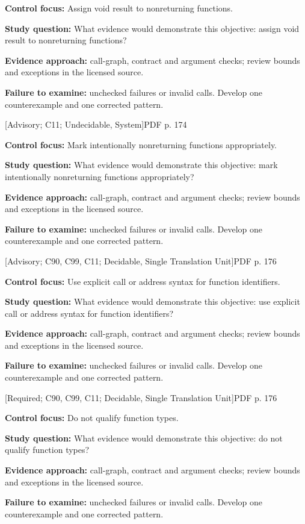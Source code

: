 \documentclass[10pt,letterpaper]{article}
\begin{document}
\textbf{Control focus:} Assign void result to nonreturning functions.\par
\textbf{Study question:} What evidence would demonstrate this objective: assign void result to nonreturning functions?\par
\textbf{Evidence approach:} call-graph, contract and argument checks; review bounds and exceptions in the licensed source.\par
\textbf{Failure to examine:} unchecked failures or invalid calls. Develop one counterexample and one corrected pattern.\par
\smallskip
{}
 \textsf{\footnotesize [Advisory; C11; Undecidable, System]}\hfill{\footnotesize PDF p. 174}\par
\textbf{Control focus:} Mark intentionally nonreturning functions appropriately.\par
\textbf{Study question:} What evidence would demonstrate this objective: mark intentionally nonreturning functions appropriately?\par
\textbf{Evidence approach:} call-graph, contract and argument checks; review bounds and exceptions in the licensed source.\par
\textbf{Failure to examine:} unchecked failures or invalid calls. Develop one counterexample and one corrected pattern.\par
\smallskip
{}
 \textsf{\footnotesize [Advisory; C90, C99, C11; Decidable, Single Translation Unit]}\hfill{\footnotesize PDF p. 176}\par
\textbf{Control focus:} Use explicit call or address syntax for function identifiers.\par
\textbf{Study question:} What evidence would demonstrate this objective: use explicit call or address syntax for function identifiers?\par
\textbf{Evidence approach:} call-graph, contract and argument checks; review bounds and exceptions in the licensed source.\par
\textbf{Failure to examine:} unchecked failures or invalid calls. Develop one counterexample and one corrected pattern.\par
\smallskip
{}
 \textsf{\footnotesize [Required; C90, C99, C11; Decidable, Single Translation Unit]}\hfill{\footnotesize PDF p. 176}\par
\textbf{Control focus:} Do not qualify function types.\par
\textbf{Study question:} What evidence would demonstrate this objective: do not qualify function types?\par
\textbf{Evidence approach:} call-graph, contract and argument checks; review bounds and exceptions in the licensed source.\par
\textbf{Failure to examine:} unchecked failures or invalid calls. Develop one counterexample and one corrected pattern.\par
\smallskip
\end{document}
